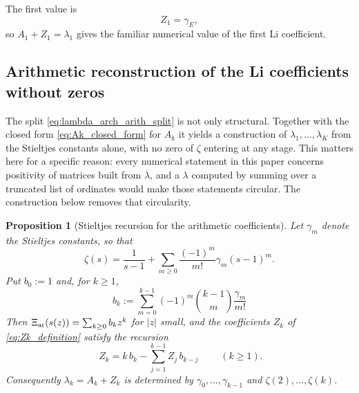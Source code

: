 \documentclass[11pt]{amsart}
\numberwithin{equation}{section}
\theoremstyle{plain}
\newtheorem{proposition}[theorem]{Proposition}
\theoremstyle{definition}
\theoremstyle{remark}
\begin{document}
The first value is
\begin{equation}
 Z_1=\gamma_E,
 \label{eq:Z1_euler}
\end{equation}
so $A_1+Z_1=\lambda_1$ gives the familiar numerical value of the first Li coefficient.


\subsection{Arithmetic reconstruction of the Li coefficients without zeros}
\label{subsec:arithmetic_reconstruction}

The split \eqref{eq:lambda_arch_arith_split} is not only structural.  Together with the
closed form \eqref{eq:Ak_closed_form} for $A_k$ it yields a construction of
$\lambda_1,\dots,\lambda_K$ from the Stieltjes constants alone, with no zero of
$\zeta$ entering at any stage.  This matters here for a specific reason: every numerical
statement in this paper concerns positivity of matrices built from $\lambda$, and a
$\lambda$ computed by summing over a truncated list of ordinates would make those
statements circular.  The construction below removes that circularity.

\begin{proposition}[Stieltjes recursion for the arithmetic coefficients]
\label{prop:stieltjes_recursion}
Let $\gamma_m$ denote the Stieltjes constants, so that
\begin{equation}
 \zeta(s)=\frac{1}{s-1}+\sum_{m\ge0}\frac{(-1)^m}{m!}\gamma_m(s-1)^m .
 \label{eq:stieltjes_expansion}
\end{equation}
Put $b_0:=1$ and, for $k\ge1$,
\begin{equation}
 \boxed{\;
 b_k:=\sum_{m=0}^{k-1}(-1)^m\binom{k-1}{m}\frac{\gamma_m}{m!}\;}
 \label{eq:bk_stieltjes}
\end{equation}
Then $\Xi_{\rm ar}(s(z))=\sum_{k\ge0}b_kz^k$ for $|z|$ small, and the coefficients
$Z_k$ of \eqref{eq:Zk_definition} satisfy the recursion
\begin{equation}
 \boxed{\;
 Z_k=k\,b_k-\sum_{j=1}^{k-1}Z_j\,b_{k-j}\;}
 \qquad(k\ge1).
 \label{eq:Zk_recursion}
\end{equation}
Consequently $\lambda_k=A_k+Z_k$ is determined by $\gamma_0,\dots,\gamma_{k-1}$ and
$\zeta(2),\dots,\zeta(k)$.
\end{proposition}
\end{document}
